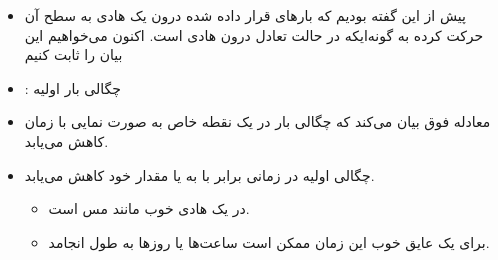 \begin{ELunit}

\begin{itemize}
\tightlist
\item
  پیش از این گفته بودیم که بارهای قرار داده شده درون یک هادی به سطح آن حرکت کرده به گونه‌ایکه در حالت تعادل درون هادی  است. اکنون می‌خواهیم این بیان را ثابت کنیم
\end{itemize}


\begin{itemize}
\tightlist
\item
  : چگالی بار اولیه
\item
  معادله فوق بیان می‌کند که چگالی بار در یک نقطه خاص به صورت نمایی با زمان کاهش می‌یابد.
\item
  چگالی اولیه در زمانی برابر با \ELim{\tau=\epsilon/\sigma} به  یا  مقدار خود کاهش می‌یابد.

  \begin{itemize}
  \tightlist
  \item
    در یک هادی خوب مانند مس  است.
  \item
    برای یک عایق خوب این زمان ممکن است ساعت‌ها یا روزها به طول انجامد.
  \end{itemize}
\end{itemize}

\end{ELunit}

\ELhold


